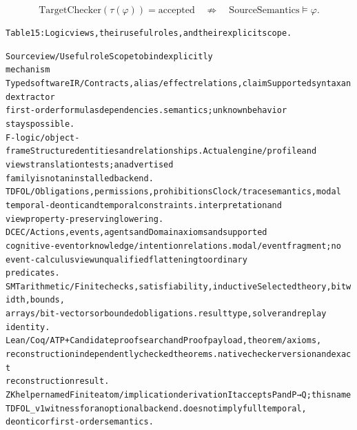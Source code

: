 \setcounter{equation}{2}
\begin{equation}
\mathrm{TargetChecker}(\tau(\varphi))=\mathrm{accepted}\quad\not\Rightarrow\quad\mathrm{SourceSemantics}\models\varphi.
\tag{3}\end{equation}

\begingroup\fontsize{7}{8.4}\selectfont
\begin{alltt}
Table 15: Logic views, their useful roles, and their explicit scope.
\end{alltt}\endgroup

\begingroup\fontsize{7}{8.4}\selectfont
\begin{alltt}
Source view /              Useful role                                Scope to bind explicitly
mechanism
Typed software IR /        Contracts, alias/effect relations, claim   Supported syntax and extractor
first-order formulas       dependencies.                              semantics; unknown behavior
                                                                      stays possible.
F-logic / object-frame     Structured entities and relationships.     Actual engine/profile and
views                                                                 translation tests; an advertised
                                                                      family is not an installed backend.
TDFOL /                    Obligations, permissions, prohibitions     Clock/trace semantics, modal
temporal-deontic           and temporal constraints.                  interpretation and
view                                                                  property-preserving lowering.
DCEC /                     Actions, events, agents and                Domain axioms and supported
cognitive-event or         knowledge/intention relations.             modal/event fragment; no
event-calculus view                                                   unqualified flattening to ordinary
                                                                      predicates.
SMT arithmetic /           Finite checks, satisfiability, inductive   Selected theory, bit width, bounds,
arrays / bit-vectors       or bounded obligations.                    result type, solver and replay
                                                                      identity.
Lean / Coq / ATP +         Candidate proof search and                 Proof payload, theorem/axioms,
reconstruction             independently checked theorems.            native checker version and exact
                                                                      reconstruction result.
ZK helper named            Finite atom/implication derivation         It accepts P and P→Q; this name
TDFOL\_v1                   witness for an optional backend.           does not imply full temporal,
                                                                      deontic or first-order semantics.
\end{alltt}\endgroup


